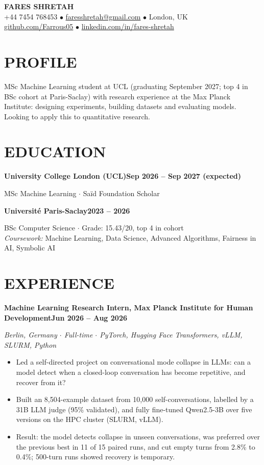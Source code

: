 \documentclass[10pt, a4paper]{article}
\newcommand{\entry}[2]{\vspace{5pt}\textbf{#1}\hfill\textbf{#2}\par}
\newcommand{\sub}[1]{\textit{#1}\par}
\begin{document}
\begin{center}
    {\huge \textbf{FARES SHRETAH}} \\[3pt]
    \small +44 7454 768453 $\bullet$ \href{mailto:faresshretah@gmail.com}{faresshretah@gmail.com} $\bullet$ London, UK \\
    \small \href{https://github.com/Farrous05}{github.com/Farrous05} $\bullet$ \href{https://www.linkedin.com/in/fares-shretah/}{linkedin.com/in/fares-shretah}
\end{center}

\section*{PROFILE}
MSc Machine Learning student at UCL (graduating September 2027; top 4 in BSc cohort at Paris-Saclay) with research experience at the Max Planck Institute: designing experiments, building datasets and evaluating models. Looking to apply this to quantitative research.

\section*{EDUCATION}
\entry{University College London (UCL)}{Sep 2026 -- Sep 2027 (expected)}
MSc Machine Learning $\cdot$ Sa\"id Foundation Scholar

\entry{Universit\'e Paris-Saclay}{2023 -- 2026}
BSc Computer Science $\cdot$ Grade: 15.43/20, top 4 in cohort \\
\textit{Coursework:} Machine Learning, Data Science, Advanced Algorithms, Fairness in AI, Symbolic AI

\section*{EXPERIENCE}
\entry{Machine Learning Research Intern, Max Planck Institute for Human Development}{Jun 2026 -- Aug 2026}
\sub{Berlin, Germany $\cdot$ Full-time $\cdot$ PyTorch, Hugging Face Transformers, vLLM, SLURM, Python}
\begin{itemize}
    \item Led a self-directed project on conversational mode collapse in LLMs: can a model detect when a closed-loop conversation has become repetitive, and recover from it?
    \item Built an 8,504-example dataset from 10,000 self-conversations, labelled by a 31B LLM judge (95\% validated), and fully fine-tuned Qwen2.5-3B over five versions on the HPC cluster (SLURM, vLLM).
    \item Result: the model detects collapse in unseen conversations, was preferred over the previous best in 11 of 15 paired runs, and cut empty turns from 2.8\% to 0.4\%; 500-turn runs showed recovery is temporary.
\end{itemize}
\end{document}

